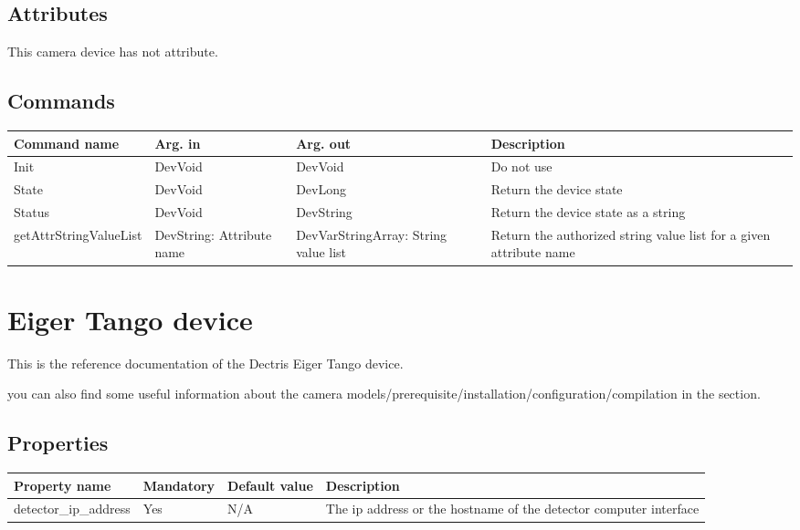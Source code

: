 \documentclass[letterpaper,10pt,english]{sphinxmanual}
\begin{document}
\section{Attributes}
\label{BaslerCCD/baslerccd:attributes}
This camera device has not attribute.


\section{Commands}
\label{BaslerCCD/baslerccd:commands}
\begin{tabulary}{\linewidth}{|L|L|L|L|}
\hline
\textsf{\relax 
Command name
} & \textsf{\relax 
Arg. in
} & \textsf{\relax 
Arg. out
} & \textsf{\relax 
Description
}\\
\hline
Init
 & 
DevVoid
 & 
DevVoid
 & 
Do not use
\\
\hline
State
 & 
DevVoid
 & 
DevLong
 & 
Return the device state
\\
\hline
Status
 & 
DevVoid
 & 
DevString
 & 
Return the device state as a string
\\
\hline
getAttrStringValueList
 & 
DevString:
Attribute name
 & 
DevVarStringArray:
String value list
 & 
Return the authorized string value list for
a given attribute name
\\
\hline\end{tabulary}



\chapter{Eiger Tango device}
\label{Eiger/eiger:eiger-tango-device}\label{Eiger/eiger::doc}
This is the reference documentation of the Dectris Eiger Tango device.

you can also find some useful information about the camera models/prerequisite/installation/configuration/compilation in the  section.


\section{Properties}
\label{Eiger/eiger:properties}
\begin{tabulary}{\linewidth}{|L|L|L|L|}
\hline
\textsf{\relax 
Property name
} & \textsf{\relax 
Mandatory
} & \textsf{\relax 
Default value
} & \textsf{\relax 
Description
}\\
\hline
detector\_ip\_address
 & 
Yes
 & 
N/A
 & 
The ip address or the hostname of the detector computer interface
\\
\hline\end{tabulary}
\end{document}
